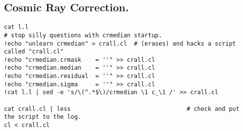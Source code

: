 \documentclass[letter,11pt,oneside]{article}
\begin{document}
\begin{landscape}
\section*{Cosmic Ray Correction.}

\begingroup \fontsize{10pt}{10pt}
\selectfont
\begin{verbatim} 
cat l.l
# stop silly questions with crmedian startup.
!echo "unlearn crmedian" > crall.cl  # (erases) and hacks a script called "crall.cl"
!echo "crmedian.crmask    = ''" >> crall.cl
!echo "crmedian.median    = ''" >> crall.cl
!echo "crmedian.residual  = ''" >> crall.cl
!echo "crmedian.sigma     = ''" >> crall.cl
!cat l.l | sed -e 's/\(^.*$\)/crmedian \1 c_\1 /' >> crall.cl

cat crall.cl | less                                 # check and put the script to the log.
cl < crall.cl
\end{verbatim}
\endgroup
\end{landscape}

\clearpage
\end{document}

